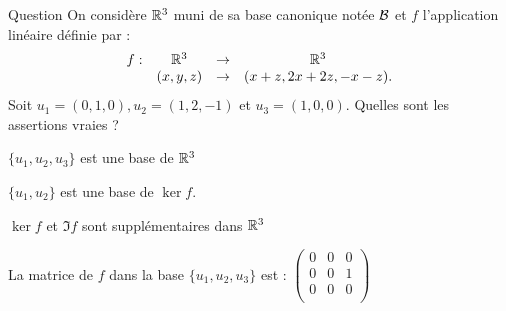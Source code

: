 \begin{multi}[multiple,feedback=
{\(\{u_1,u_2,u_3\}\) est une base de \(\Rr^3\),  
\(\{u_1 , u_2\}\)  est une base de \(\ker f\) et  \(\{u_2\}\)  est une base de \(\Im f\). Comme \( \ker f \cap \Im f\) est non nul, \(\ker f \) et \(\Im f\) ne sont pas supplémentaires dans \(\Rr^3\). Comme \(f(u_1)=f(u_2)=0\) et \(f(u_3)=u_2\), la matrice dans la base
\(\{u_1,u_2,u_3\}\) est : 
\[\left(\begin{array}{rcc}
0&0&0\\
0&0&1\\ 
0&0&0\end{array}\right).\]
}]{Question}
On considère \(\Rr^3\) muni de sa base canonique notée \({\cal {B}}\) et 
\(f\) l'application linéaire définie  par : 
\[\begin{array}{rccc}f:&\mathbb{R}^3 &\to& \mathbb{R}^3\\
& (x,y,z)&\to &(x+z,2x+2z,-x-z).  \end{array}\]
Soit \( u_1=(0,1,0), u_2=(1,2,-1)\) et \( u_3=(1,0,0)\).  
Quelles sont les assertions vraies ?

    \item* \(\{u_1,u_2,u_3\}\) est une base de \(\Rr^3\)
    \item* \(\{u_1 , u_2\}\)  est une base de \(\ker f\).
    \item \(\ker f\) et \(\Im f\) sont supplémentaires dans \(\Rr^3\)
    \item* La matrice de \(f\) dans la base  \(\{u_1,u_2,u_3\}\) est :
\(\left(\begin{array}{rcc}
0&0&0\\
0&0&1\\
0&0&0\\
\end{array}\right)\)
\end{multi}


